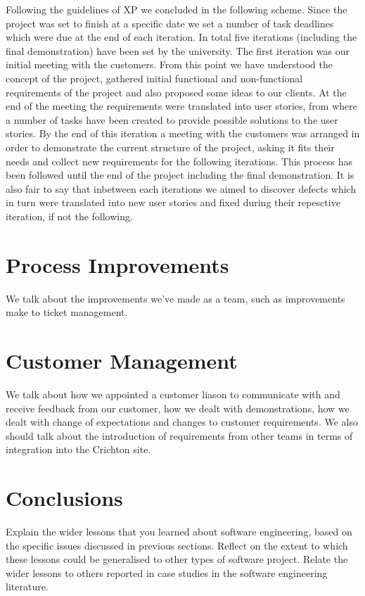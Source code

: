 \documentclass{l3proj}
\begin{document}
Following the guidelines of XP we concluded in the following scheme. Since the project was set to finish at a specific date
we set a number of task deadlines which were due at the end of each iteration. In total five iterations
(including the final demonstration) have been set by the university. The first iteration was our initial meeting with
the customers. From this point we have understood the concept of the project, gathered initial functional and non-functional
requirements of the project and also proposed some ideas to our clients. At the end of the meeting the requirements were
translated into user stories, from where a number of tasks have been created to provide possible solutions to the user stories.
By the end of this iteration a meeting with the customers was arranged in order to demonstrate the current structure of the
project, asking it fits their needs and collect new requirements for the following iterations. This process has been followed
until the end of the project including the final demonstration. It is also fair to say that inbetween each iterations we
aimed to discover defects which in turn were translated into new user stories and fixed during their repesctive iteration,
if not the following.

\section{Process Improvements}
\label{managing}

We talk about the improvements we've made as a team, such as improvements make to ticket management.



\section{Customer Management}
\label{sec:managing}

We talk about how we appointed a customer liason to communicate with and receive feedback from our customer, how we dealt with
demonstrations, how we dealt with change of expectations and changes to customer requirements. We also should talk about the
introduction of requirements from other teams in terms of integration into the Crichton site.


\section{Conclusions}

Explain the wider lessons that you learned about software engineering,
based on the specific issues discussed in previous sections.  Reflect
on the extent to which these lessons could be generalised to other
types of software project.  Relate the wider lessons to others
reported in case studies in the software engineering literature.



\end{document}

